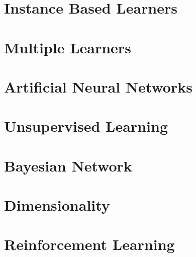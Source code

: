 \documentclass[a4paper, 11pt, extrafontsizes, oneside, openany, x11names]{memoir} %
\begin{document}
\chapter{Instance Based Learners}


\chapter{Multiple Learners}


\chapter{Artificial Neural Networks}


\chapter{Unsupervised Learning}


\chapter{Bayesian Network}


\chapter{Dimensionality}



\chapter{Reinforcement Learning}

\end{document}

